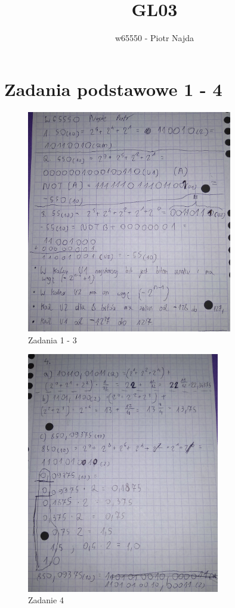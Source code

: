 \documentclass[12pt,a4paper]{article}
\title{GL03}
\author{w65550 - Piotr Najda}
\begin{document}
\maketitle

\section{Zadania podstawowe 1 - 4}

\begin{figure}[ht]
\centering
\includegraphics[width=0.80\textwidth]{IMG_20211102_174411.jpg}
\caption{\label{fig:zad1do3}Zadania 1 - 3}
\end{figure}

\begin{figure}[ht]
\centering
\includegraphics[width=0.75\textwidth]{IMG_20211102_174430~2.jpg}
\caption{\label{fig:zad4}Zadanie 4}
\end{figure}
\end{document}
